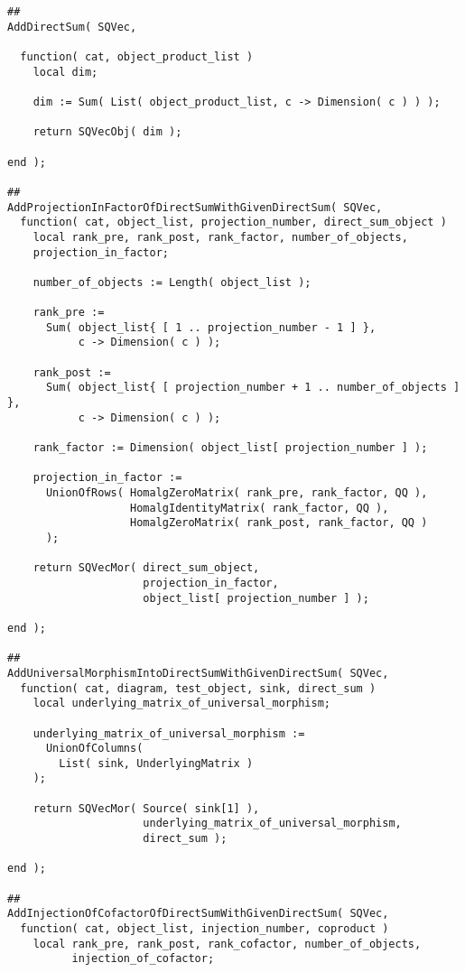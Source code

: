 \begin{small}
\begin{Verbatim}[frame=single]
##
AddDirectSum( SQVec,

  function( cat, object_product_list )
    local dim;
    
    dim := Sum( List( object_product_list, c -> Dimension( c ) ) );
    
    return SQVecObj( dim );
  
end );

##
AddProjectionInFactorOfDirectSumWithGivenDirectSum( SQVec,
  function( cat, object_list, projection_number, direct_sum_object )
    local rank_pre, rank_post, rank_factor, number_of_objects,
    projection_in_factor;
    
    number_of_objects := Length( object_list );
    
    rank_pre := 
      Sum( object_list{ [ 1 .. projection_number - 1 ] },
           c -> Dimension( c ) );
    
    rank_post := 
      Sum( object_list{ [ projection_number + 1 .. number_of_objects ] },
           c -> Dimension( c ) );
    
    rank_factor := Dimension( object_list[ projection_number ] );
    
    projection_in_factor := 
      UnionOfRows( HomalgZeroMatrix( rank_pre, rank_factor, QQ ),
                   HomalgIdentityMatrix( rank_factor, QQ ),
                   HomalgZeroMatrix( rank_post, rank_factor, QQ )
      );
    
    return SQVecMor( direct_sum_object,
                     projection_in_factor,
                     object_list[ projection_number ] );
    
end );

##
AddUniversalMorphismIntoDirectSumWithGivenDirectSum( SQVec,
  function( cat, diagram, test_object, sink, direct_sum )
    local underlying_matrix_of_universal_morphism;
    
    underlying_matrix_of_universal_morphism :=
      UnionOfColumns(
        List( sink, UnderlyingMatrix )
    );
    
    return SQVecMor( Source( sink[1] ),
                     underlying_matrix_of_universal_morphism,
                     direct_sum );
  
end );

##
AddInjectionOfCofactorOfDirectSumWithGivenDirectSum( SQVec,
  function( cat, object_list, injection_number, coproduct )
    local rank_pre, rank_post, rank_cofactor, number_of_objects,
          injection_of_cofactor;
    

\end{Verbatim}
\end{small}
